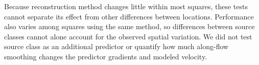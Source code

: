 \documentclass[review,jog]{igs}
\begin{document}
Because reconstruction method changes little within most squares,
these tests cannot separate its effect from other differences between
locations. Performance also varies among squares using the same
method, so differences between source classes cannot alone account
for the observed spatial variation. We did not test source class as an additional predictor or quantify how much along-flow smoothing changes the predictor gradients and modeled velocity.
\end{document}
